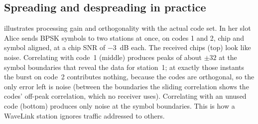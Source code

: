 \documentclass[11pt,a4paper,oneside]{report}
\begin{document}
\subsection{Spreading and despreading in practice}
 illustrates processing gain and orthogonality with the actual code set. In her slot
Alice sends BPSK symbols to two stations at once, on codes 1 and 2, chip and symbol aligned, at a chip
SNR of \SI{-3}{dB} each. The received chips (top) look like noise. Correlating with code~1 (middle)
produces peaks of about $\pm32$ at the symbol boundaries that reveal the data for station~1; at exactly
those instants the burst on code~2 contributes nothing, because the codes are orthogonal, so the only
error left is noise (between the boundaries the sliding correlation shows the codes' off-peak
correlation, which no receiver uses). Correlating with an unused code (bottom) produces only noise at
the symbol boundaries. This is how a WaveLink station ignores traffic addressed to others.
\end{document}
